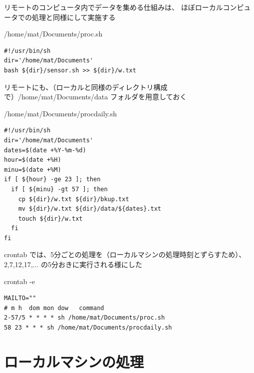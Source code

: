 \documentclass[12pt,a4j]{jsbook}
\begin{document}

リモートのコンピュータ内でデータを集める仕組みは、
ほぼローカルコンピュータでの処理と同様にして実施する

\begin{spacing}{0.95}
\begin{itembox}[l]{/home/mat/Documents/proc.sh}
\begin{verbatim}
#!/usr/bin/sh
dir='/home/mat/Documents'
bash ${dir}/sensor.sh >> ${dir}/w.txt
\end{verbatim}
\end{itembox}
\end{spacing}

リモートにも、（ローカルと同様のディレクトリ構成で）/home/mat/Documents/data フォルダを用意しておく

\begin{spacing}{0.95}
\begin{itembox}[l]{/home/mat/Documents/procdaily.sh}
\begin{verbatim}
#!/usr/bin/sh
dir='/home/mat/Documents'
dates=$(date +%Y-%m-%d)
hour=$(date +%H)
minu=$(date +%M)
if [ ${hour} -ge 23 ]; then
  if [ ${minu} -gt 57 ]; then
    cp ${dir}/w.txt ${dir}/bkup.txt
    mv ${dir}/w.txt ${dir}/data/${dates}.txt
    touch ${dir}/w.txt
  fi
fi
\end{verbatim}
\end{itembox}
\end{spacing}

crontab では、5分ごとの処理を（ローカルマシンの処理時刻とずらすため）、2,7,12,17,... の5分おきに実行される様にした

\begin{spacing}{0.95}
\begin{itembox}[l]{crontab -e}
\begin{verbatim}
MAILTO=""
# m h  dom mon dow   command
2-57/5 * * * * sh /home/mat/Documents/proc.sh
58 23 * * * sh /home/mat/Documents/procdaily.sh
\end{verbatim}
\end{itembox}
\end{spacing}

\newpage

\section{ローカルマシンの処理}
\end{document}
